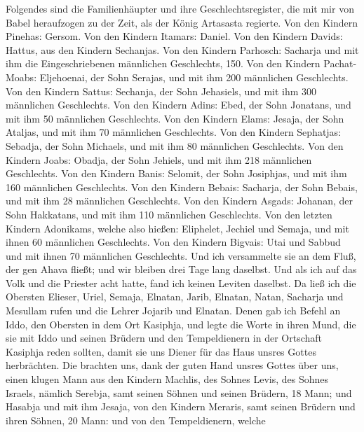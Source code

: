  Folgendes sind die Familienhäupter und ihre
Geschlechtsregister, die mit mir von Babel heraufzogen zu der Zeit, als
der König Artasasta regierte.  Von den Kindern Pinehas:
Gersom. Von den Kindern Itamars: Daniel. Von den Kindern Davids: Hattus,
aus den Kindern Sechanjas.  Von den Kindern Parhosch:
Sacharja und mit ihm die Eingeschriebenen männlichen Geschlechts, 150.
 Von den Kindern Pachat-Moabs: Eljehoenai, der Sohn
Serajas, und mit ihm 200 männlichen Geschlechts.  Von den
Kindern Sattus: Sechanja, der Sohn Jehasiels, und mit ihm 300 männlichen
Geschlechts.  Von den Kindern Adins: Ebed, der Sohn
Jonatans, und mit ihm 50 männlichen Geschlechts.  Von den
Kindern Elams: Jesaja, der Sohn Ataljas, und mit ihm 70 männlichen
Geschlechts.  Von den Kindern Sephatjas: Sebadja, der Sohn
Michaels, und mit ihm 80 männlichen Geschlechts.  Von den
Kindern Joabs: Obadja, der Sohn Jehiels, und mit ihm 218 männlichen
Geschlechts.  Von den Kindern Banis: Selomit, der Sohn
Josiphjas, und mit ihm 160 männlichen Geschlechts.  Von
den Kindern Bebais: Sacharja, der Sohn Bebais, und mit ihm 28 männlichen
Geschlechts.  Von den Kindern Asgads: Johanan, der Sohn
Hakkatans, und mit ihm 110 männlichen Geschlechts.  Von
den letzten Kindern Adonikams, welche also hießen: Eliphelet, Jechiel
und Semaja, und mit ihnen 60 männlichen Geschlechts.  Von
den Kindern Bigvais: Utai und Sabbud und mit ihnen 70 männlichen
Geschlechts.  Und ich versammelte sie an dem Fluß, der
gen Ahava fließt; und wir bleiben drei Tage lang daselbst. Und als ich
auf das Volk und die Priester acht hatte, fand ich keinen Leviten
daselbst.  Da ließ ich die Obersten Elieser, Uriel,
Semaja, Elnatan, Jarib, Elnatan, Natan, Sacharja und Mesullam rufen und
die Lehrer Jojarib und Elnatan.  Denen gab ich Befehl an
Iddo, den Obersten in dem Ort Kasiphja, und legte die Worte in ihren
Mund, die sie mit Iddo und seinen Brüdern und den Tempeldienern in der
Ortschaft Kasiphja reden sollten, damit sie uns Diener für das Haus
unsres Gottes herbrächten.  Die brachten uns, dank der
guten Hand unsres Gottes über uns, einen klugen Mann aus den Kindern
Machlis, des Sohnes Levis, des Sohnes Israels, nämlich Serebja, samt
seinen Söhnen und seinen Brüdern, 18 Mann;  und Hasabja
und mit ihm Jesaja, von den Kindern Meraris, samt seinen Brüdern und
ihren Söhnen, 20 Mann:  und von den Tempeldienern, welche
